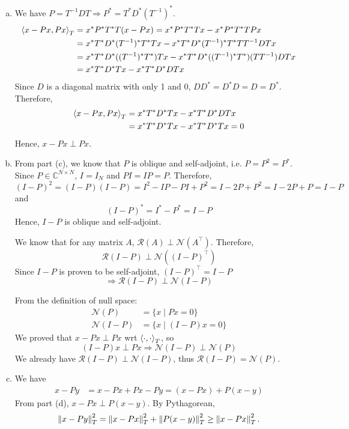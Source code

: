 \begin{enumerate}[(a)]
\item We have $P = T^{-1}DT \Rightarrow P^* = T^* D^* (T^{-1})^*$.
\begin{align*}
	\left\langle x-Px, Px \right\rangle_T 
	&= x^* P^* T^* T (x - Px) = x^* P^* T^* T x - x^* P^* T^* T P x \\
	&= x^* T^* D^* (T^{-1})^* T^* T x - x^* T^* D^* (T^{-1})^* T^* T T^{-1}DT x \\
	&= x^* T^* D^* ((T^{-1})^* T^*) T x - x^* T^* D^* ((T^{-1})^* T^*) (T T^{-1})DT x \\
	&= x^* T^* D^* T x - x^* T^* D^* DT x
\end{align*}
Since $D$ is a diagonal matrix with only 1 and 0, $D D^* = D^* D = D = D^*$. Therefore,
\begin{align*}
	\left\langle x-Px, Px \right\rangle_T 
	&= x^* T^* D^* T x - x^* T^* D^* DT x \\
	&= x^* T^* D^* T x - x^* T^* D^* T x = 0
\end{align*}
Hence, $x-Px \perp Px$.

\item From part (c), we know that $P$ is oblique and self-adjoint, i.e. $P = P^2 = P^*$. Since $P \in \mathbb{C}^{N \times N}$, $I = I_N$ and $PI = IP = P$. Therefore,
\[(I-P)^2 = (I-P)(I-P) = I^2 - IP - PI + P^2 = I - 2P + P^2 = I - 2P + P = I - P\]
and
\[(I-P)^* = I^* - P^* = I - P\]
Hence, $I-P$ is oblique and self-adjoint.

We know that for any matrix $A$, $\mathcal{R}(A) \perp \mathcal{N}(A^\top)$. Therefore,
\[\mathcal{R}(I-P) \perp \mathcal{N}((I-P)^\top)\]
Since $I-P$ is proven to be self-adjoint, $(I-P)^\top = I-P$
\[\Rightarrow \mathcal{R}(I-P) \perp \mathcal{N}(I-P)\]

From the definition of null space:
\begin{align*}
	\mathcal{N}(P) &= \{x \mid Px = 0\} \\
	\mathcal{N}(I-P) &= \{x \mid (I-P)x = 0\}
\end{align*}
We proved that $x-Px \perp Px$ wrt $\left\langle \cdot, \cdot \right\rangle_T$, so 
\[(I-P)x \perp Px \Rightarrow \mathcal{N}(I-P) \perp \mathcal{N}(P)\]
We already have $\mathcal{R}(I-P) \perp \mathcal{N}(I-P)$, thus $\mathcal{R}(I-P) = \mathcal{N}(P)$.

\item We have
\begin{align*}
	x - Py &= x - Px + Px - Py = (x-Px) + P(x-y)
\end{align*}
From part (d), $x-Px \perp P(x-y)$. By Pythagorean,
\begin{align*}
	\left\lVert x - Py \right\rVert_T^2 = \left\lVert x-Px \right\rVert_T^2 + \left\lVert P(x-y) \right\rVert_T^2 \geq \left\lVert x-Px \right\rVert_T^2.
\end{align*}
\end{enumerate}